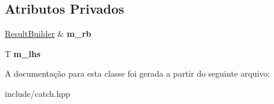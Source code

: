 \subsection*{Atributos Privados}
\begin{DoxyCompactItemize}
\item 
\hyperlink{classCatch_1_1ResultBuilder}{Result\+Builder} \& {\bfseries m\+\_\+rb}\hypertarget{classCatch_1_1ExpressionLhs_a3985f8b57f5c57b45bde187ee800c1b3}{}\label{classCatch_1_1ExpressionLhs_a3985f8b57f5c57b45bde187ee800c1b3}

\item 
T {\bfseries m\+\_\+lhs}\hypertarget{classCatch_1_1ExpressionLhs_a1859bbffe494088b59519c229db2a4af}{}\label{classCatch_1_1ExpressionLhs_a1859bbffe494088b59519c229db2a4af}

\end{DoxyCompactItemize}


A documentação para esta classe foi gerada a partir do seguinte arquivo\+:\begin{DoxyCompactItemize}
\item 
include/catch.\+hpp\end{DoxyCompactItemize}
